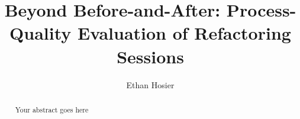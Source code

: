 \documentclass[a4paper, twoside, 11pt]{report}
\title{Beyond Before-and-After: Process-Quality Evaluation of Refactoring Sessions}
\author{Ethan Hosier}
\begin{document}


\begin{abstract}
Your abstract goes here
\end{abstract}

\tableofcontents











\end{document}
